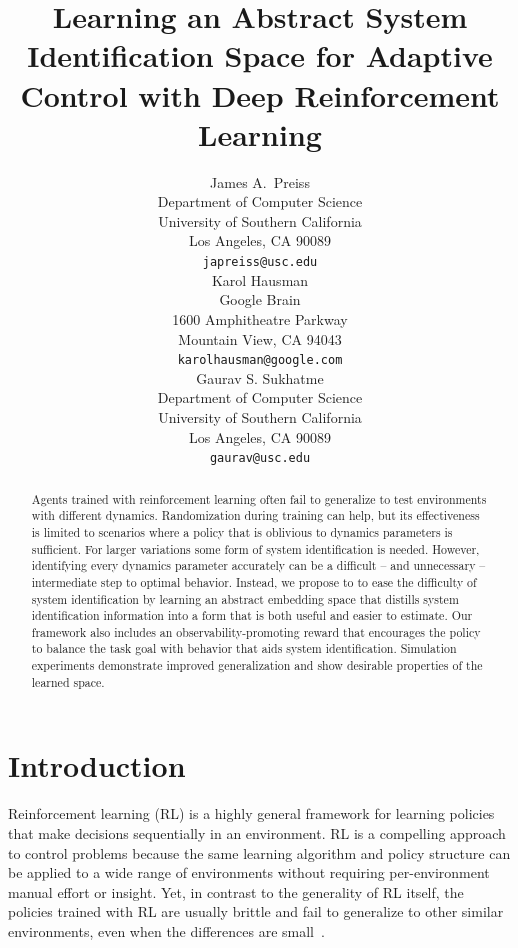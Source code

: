 \documentclass{article}
\title{Learning an Abstract System Identification Space for Adaptive Control with Deep Reinforcement Learning}
\author{
  James A.~Preiss \\
  Department of Computer Science\\
  University of Southern California\\
  Los Angeles, CA 90089\\
  \texttt{japreiss@usc.edu} \\
  \AND
  Karol Hausman \\
  Google Brain \\
  1600 Amphitheatre Parkway\\
  Mountain View, CA 94043 \\
  \texttt{karolhausman@google.com} \\
  \And
  Gaurav S. Sukhatme \\
  Department of Computer Science\\
  University of Southern California\\
  Los Angeles, CA 90089\\
  \texttt{gaurav@usc.edu} \\
}
\newcommand{\sysid}{dynamics}
\begin{document}
\maketitle

\begin{abstract}
Agents trained with reinforcement learning often fail to generalize to test environments with different dynamics.
Randomization during training can help,
but its effectiveness is limited to scenarios where a policy that is oblivious to \sysid{} parameters is sufficient.
For larger variations some form of system identification is needed.
However, identifying every dynamics parameter accurately can be a difficult -- and unnecessary -- intermediate step to optimal behavior.
Instead, we propose to to ease the difficulty of system identification by learning an abstract embedding space
that distills system identification information into a form that is both useful and easier to estimate.
Our framework also includes an observability-promoting reward that encourages the policy to balance the task goal with behavior that aids system identification.
Simulation experiments demonstrate improved generalization and show desirable properties of the learned space.
\end{abstract}

\section{Introduction}

Reinforcement learning (RL) is a highly general framework for learning policies that make decisions sequentially in an environment.
RL is a compelling approach to control problems
because the same learning algorithm and policy structure can be applied to a wide range of environments
without requiring per-environment manual effort or insight.
Yet, in contrast to the generality of RL itself,
the policies trained with RL are usually brittle and fail to generalize to other similar environments,
even when the differences are small~\citep{zhang-study-on-overfitting}.

\end{document}
